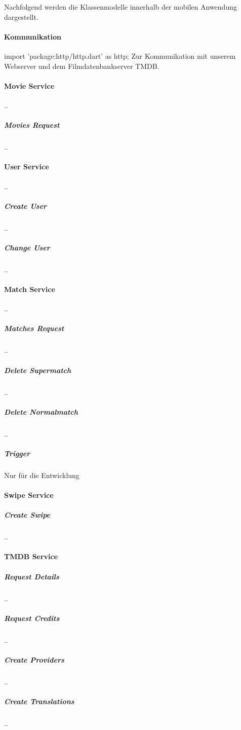 Nachfolgend werden die Klassenmodelle innerhalb der mobilen Anwendung dargestellt.

\paragraph{Kommunikation}
import 'package:http/http.dart' as http;
Zur Kommunikation mit unserem Webserver und dem Filmdatenbankserver TMDB.


\paragraph{Movie Service}
..
\subparagraph{Movies Request}
..
\paragraph{User Service}
..
\subparagraph{Create User}
..
\subparagraph{Change User}
..

\paragraph{Match Service}
..
\subparagraph{Matches Request}
..
\subparagraph{Delete Supermatch}
..
\subparagraph{Delete Normalmatch}
..
\subparagraph{Trigger}
Nur für die Entwicklung


\paragraph{Swipe Service}
\subparagraph{Create Swipe}
..

\paragraph{TMDB Service}
\subparagraph{Request Details}
..

\subparagraph{Request Credits}
..

\subparagraph{Create Providers}
..

\subparagraph{Create Translations}
..

